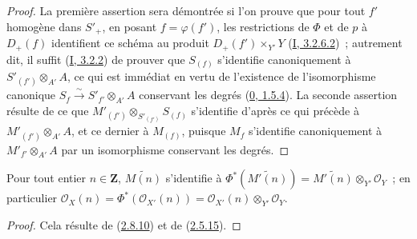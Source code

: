 \begin{proof}
La première assertion sera démontrée si l'on prouve que pour tout $f'$
homogène dans $S'_+$, en posant $f=\varphi(f')$, les restrictions de $\Phi$
et de $p$ à $D_+(f)$ identifient ce schéma au produit
$D_+(f')\times_{Y'}Y$ (\hyperref[I.3.2.6.2-fr]{I, 3.2.6.2})~; autrement
dit, il suffit (\hyperref[I.3.2.2-fr]{I, 3.2.2}) de prouver que $S_{(f)}$
s'identifie canoniquement à $S'_{(f')}\otimes_{A'}A$, ce qui est immédiat
en vertu de l'existence de l'isomorphisme canonique
$S_f\xrightarrow{\sim}S'_{f'}\otimes_{A'}A$ conservant les degrés
(\hyperref[0.1.5.4-fr]{0, 1.5.4}). La seconde assertion résulte de ce que
$M'_{(f')}\otimes_{S'_{(f')}}S_{(f)}$ s'identifie d'après ce qui précède à
$M'_{(f')}\otimes_{A'}A$, et ce dernier à $M_{(f)}$, puisque $M_f$
s'identifie canoniquement à $M'_{f'}\otimes_{A'}A$ par un isomorphisme
conservant les degrés.
\end{proof}

\begin{corollary}[2.8.11]
\label{II.2.8.11-fr}
Pour tout entier $n\in\mathbf{Z}$, $\widetilde{M(n)}$ s'identifie à
$\Phi^*(\widetilde{M'(n)})=\widetilde{M'(n)}\otimes_{Y'}\mathcal{O}_Y$~;
en particulier
$\mathcal{O}_X(n)=\Phi^*(\mathcal{O}_{X'}(n))
=\mathcal{O}_{X'}(n)\otimes_{Y'}\mathcal{O}_Y$.
\end{corollary}

\begin{proof}
Cela résulte de (\hyperref[II.2.8.10-fr]{2.8.10}) et de
(\hyperref[II.2.5.15-fr]{2.5.15}).
\end{proof}

